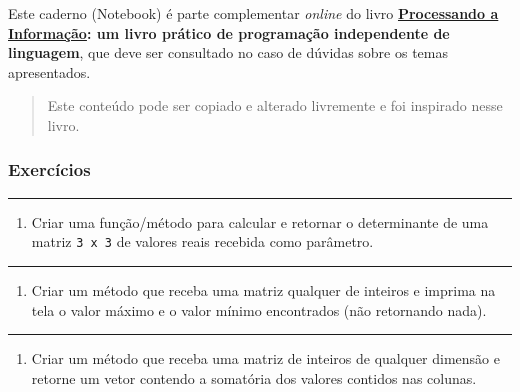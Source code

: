 \documentclass[12pt,a4paper]{article}
\providecommand{\tightlist}{%
      \setlength{\itemsep}{0pt}\setlength{\parskip}{0pt}}
\begin{document}
Este caderno (Notebook) é parte complementar \emph{online} do livro
\textbf{\href{https://editora.ufabc.edu.br/matematica-e-ciencias-da-computacao/58-processando-a-informacao}{Processando
a Informação}: um livro prático de programação independente de
linguagem}, que deve ser consultado no caso de dúvidas sobre os temas
apresentados.

\begin{quote}
Este conteúdo pode ser copiado e alterado livremente e foi inspirado
nesse livro.
\end{quote}

    \hypertarget{exercuxedcios}{%
\subsubsection{Exercícios}\label{exercuxedcios}}

    \begin{center}\rule{0.5\linewidth}{0.5pt}\end{center}

\begin{enumerate}
\def\labelenumi{\arabic{enumi}.}
\tightlist
\item
  Criar uma função/método para calcular e retornar o determinante de uma
  matriz \texttt{3\ x\ 3} de valores reais recebida como parâmetro.
\end{enumerate}

    \begin{center}\rule{0.5\linewidth}{0.5pt}\end{center}

\begin{enumerate}
\def\labelenumi{\arabic{enumi}.}
\setcounter{enumi}{1}
\tightlist
\item
  Criar um método que receba uma matriz qualquer de inteiros e imprima
  na tela o valor máximo e o valor mínimo encontrados (não retornando
  nada).
\end{enumerate}

    \begin{center}\rule{0.5\linewidth}{0.5pt}\end{center}

\begin{enumerate}
\def\labelenumi{\arabic{enumi}.}
\setcounter{enumi}{2}
\tightlist
\item
  Criar um método que receba uma matriz de inteiros de qualquer dimensão
  e retorne um vetor contendo a somatória dos valores contidos nas
  colunas.
\end{enumerate}
\end{document}
